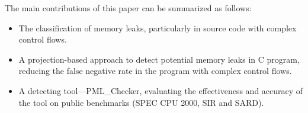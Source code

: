 The main contributions of this paper can be summarized as follows:
\begin{itemize}
\item The classification of memory leaks, particularly in source code with complex control flows.
\item A projection-based approach to detect potential memory leaks in C program, reducing the false negative rate in the program with complex control flows.
\item A detecting tool---PML\_Checker, evaluating the effectiveness and accuracy of the tool on public benchmarks (SPEC CPU 2000, SIR and SARD). 
\end{itemize}

